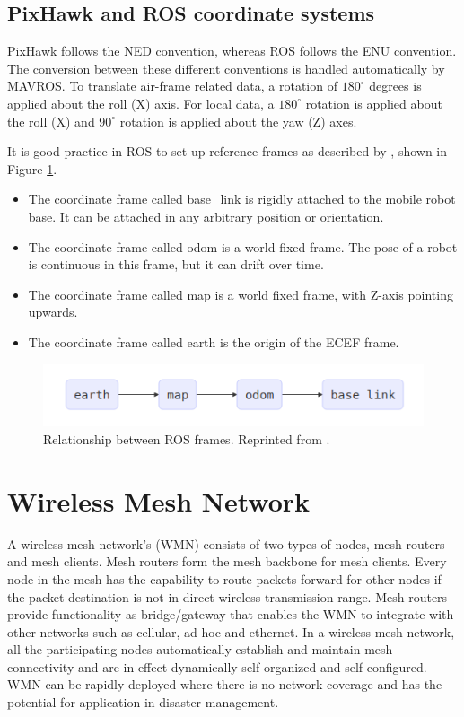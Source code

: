 \subsection{PixHawk and ROS coordinate systems}

PixHawk follows the NED convention, whereas ROS follows the ENU convention. The conversion between these different conventions is handled automatically by MAVROS. To translate air-frame related data, a rotation of $180^{\circ}$ degrees is applied about the roll (X) axis. For local data, a $180^{\circ}$ rotation is applied about the roll (X) and $90^{\circ}$ rotation is applied about the yaw (Z) axes.

It is good practice in ROS to set up reference frames as described by , shown in Figure \ref{fig:rosrefframes}.

\begin{itemize}
	\item The coordinate frame called base\_link is rigidly attached to the mobile robot base. It can be attached in any arbitrary position or orientation.
	\item The coordinate frame called odom is a world-fixed frame. The pose of a robot is continuous in this frame, but it can drift over time.
	\item The coordinate frame called map is a world fixed frame, with Z-axis pointing upwards. 
	\item The coordinate frame called earth is the origin of the ECEF frame.
\end{itemize}

\begin{figure}
	\centering
	\includegraphics[width=5in]{figures/literature/ros_rel_frames}
	\caption[Relation between ROS frames]{\small 
	Relationship between ROS frames. Reprinted from . }
	\label{fig:rosrefframes}
\end{figure}

\section{Wireless Mesh Network}

A wireless mesh network's (WMN) consists of two types of nodes, mesh routers and mesh clients. Mesh routers form the mesh backbone for mesh clients. Every node in the mesh has the capability to route packets forward for other nodes if the packet destination is not in direct wireless transmission range. Mesh routers provide functionality as bridge/gateway that enables the WMN to integrate with other networks such as cellular, ad-hoc and ethernet. In a wireless mesh network, all the participating nodes automatically establish and maintain mesh connectivity and are in effect dynamically self-organized and self-configured. WMN can be rapidly deployed where there is no network coverage and has the potential for application in disaster management.

